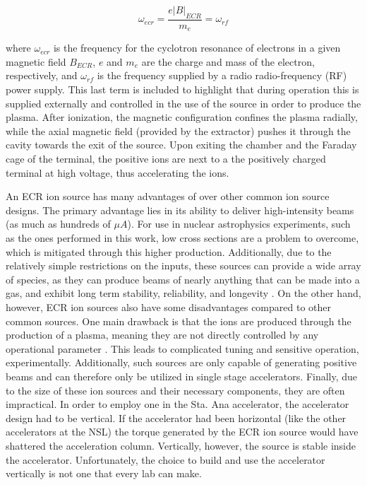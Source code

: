 \begin{equation}
\omega_{ecr} = \dfrac{e | B |_{ECR}}{m_{e}} = \omega_{rf}
\label{eqn: ecr}
\end{equation}

\noindent where $\omega_{ecr}$ is the frequency for the cyclotron resonance of electrons in a given magnetic field $B_{ECR}$, $e$ and $m_{e}$ are the charge and mass of the electron, respectively, and $\omega_{rf}$ is the frequency supplied by a radio radio-frequency (RF) power supply. This last term is included to highlight that during operation this is supplied externally and controlled in the use of the source in order to produce the plasma. After ionization, the magnetic configuration confines the plasma radially, while the axial magnetic field (provided by the extractor) pushes it through the cavity towards the exit of the source. Upon exiting the chamber and the Faraday cage of the terminal, the positive ions are next to a the positively charged terminal at high voltage, thus accelerating the ions. 

An ECR ion source has many advantages of over other common ion source designs. The primary advantage lies in its ability to deliver high-intensity beams (as much as hundreds of $\mu A$). For use in nuclear astrophysics experiments, such as the ones performed in this work, low cross sections are a problem to overcome, which is mitigated through this higher production. Additionally, due to the relatively simple restrictions on the inputs, these sources can provide a wide array of species, as they can produce beams of nearly anything that can be made into a gas, and exhibit long term stability, reliability, and longevity \cite{Melin1997}.  On the other hand, however, ECR ion sources also have some disadvantages compared to other common sources. One main drawback is that the ions are produced through the production of a plasma, meaning they are not directly controlled by any operational parameter \cite{Melin1997}. This leads to complicated tuning and sensitive operation, experimentally. Additionally, such sources are only capable of generating positive beams and can therefore only be utilized in single stage accelerators. Finally, due to the size of these ion sources and their necessary components, they are often impractical. In order to employ one in the Sta. Ana accelerator, the accelerator design had to be vertical. If the accelerator had been horizontal (like the other accelerators at the NSL) the torque generated by the ECR ion source would have shattered the acceleration column. Vertically, however, the source is stable inside the accelerator. Unfortunately, the choice to build and use the accelerator vertically is not one that every lab can make. 

